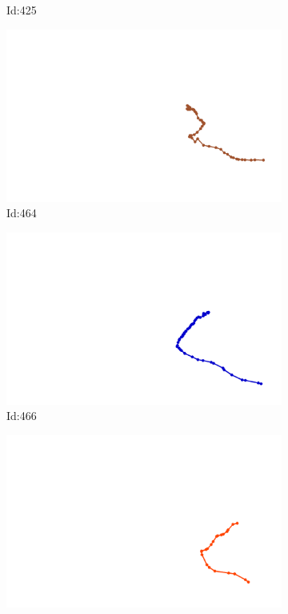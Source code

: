 \documentclass[12pt,twoside]{report}
\begin{document}
\begin{figure}
\begin{subfigure}[b]{0.20\textwidth}
\caption{Id:425}
\end{subfigure}
\begin{subfigure}[b]{0.20\textwidth}
\centering
\includegraphics[width=\textwidth]{../trajectories/464.png}
\caption{Id:464}
\end{subfigure}
\begin{subfigure}[b]{0.20\textwidth}
\centering
\includegraphics[width=\textwidth]{../trajectories/466.png}
\caption{Id:466}
\end{subfigure}
\begin{subfigure}[b]{0.20\textwidth}
\centering
\includegraphics[width=\textwidth]{../trajectories/475.png}

\end{subfigure}
\end{figure}
\end{document}
